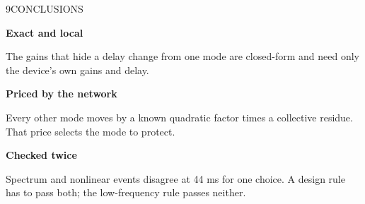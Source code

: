 \begin{minipage}[t][\PosterBottomRowHeight][t]{\PosterGridWidth}\vspace{0pt}
  \begin{PosterPanel}{\PosterBottomRowHeight}{9}{CONCLUSIONS}

    \noindent\begin{minipage}[t]{278mm}\vspace{0pt}
      {\MetricSize\bfseries\color{IASBlue}Exact and local\par}
      {\FigureSize The gains that hide a delay change from one mode are closed-form and need only the device's own gains and delay.\par}
    \end{minipage}\hfill%
    \begin{minipage}[t]{278mm}\vspace{0pt}
      {\MetricSize\bfseries\color{IASDarkGreen}Priced by the network\par}
      {\FigureSize Every other mode moves by a known quadratic factor times a collective residue. That price selects the mode to protect.\par}
    \end{minipage}\hfill%
    \begin{minipage}[t]{278mm}\vspace{0pt}
      {\MetricSize\bfseries\color{IASGold!70!black}Checked twice\par}
      {\FigureSize Spectrum and nonlinear events disagree at 44 ms for one choice. A design rule has to pass both; the low-frequency rule passes neither.\par}
    \end{minipage}\par

  \end{PosterPanel}
\end{minipage}%
